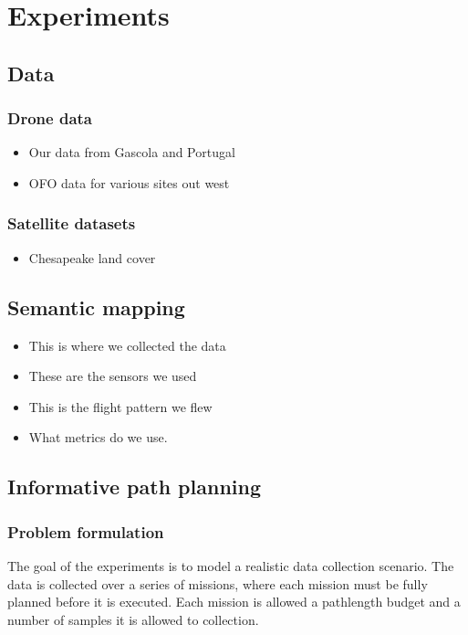 \chapter{Experiments} \label{chapExperiments}

\section{Data}
\subsection{Drone data}
\begin{itemize}
    \item Our data from Gascola and Portugal
    \item OFO data for various sites out west 
\end{itemize}

\subsection{Satellite datasets}
\begin{itemize}
    \item Chesapeake land cover 
\end{itemize}

\section{Semantic mapping}
\begin{itemize}
    \item This is where we collected the data
    \item These are the sensors we used
    \item This is the flight pattern we flew
    \item What metrics do we use.
\end{itemize}

\section{Informative path planning}

\subsection{Problem formulation}
The goal of the experiments is to model a realistic data collection scenario. The data is collected over a series of missions, where each mission must be fully planned before it is executed. Each mission is allowed a pathlength budget and a number of samples it is allowed to collection. 


